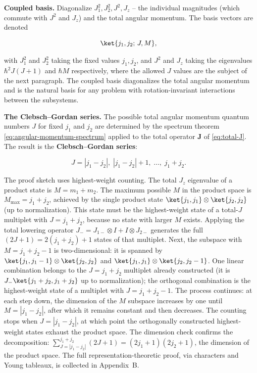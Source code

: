 \textbf{Coupled basis.} Diagonalize $J_1^2, J_2^2, J^2, J_z$ -- the individual magnitudes (which commute with $J^2$ and $J_z$) and the total angular momentum. The basis vectors are denoted
\begin{linenomath}
  \begin{equation}
    \ket{j_1,j_2;\,J,M},
  \end{equation}
\end{linenomath}
with $J_1^2$ and $J_2^2$ taking the fixed values $j_1,j_2$, and $J^2$ and $J_z$ taking the eigenvalues $\hbar^2 J(J+1)$ and $\hbar M$ respectively, where the allowed $J$ values are the subject of the next paragraph. The coupled basis diagonalizes the total angular momentum and is the natural basis for any problem with rotation-invariant interactions between the subsystems.

\medskip\noindent\textbf{The Clebsch--Gordan series.}
The possible total angular momentum quantum numbers $J$ for fixed $j_1$ and $j_2$ are determined by the spectrum theorem \eqref{eq:angular-momentum-spectrum} applied to the total operator $\bm J$ of \eqref{eq:total-J}. The result is the \textbf{Clebsch--Gordan series}:
\begin{linenomath}
  \begin{equation}
    J = |j_1 - j_2|,\; |j_1 - j_2| + 1,\; \ldots,\; j_1 + j_2.
    \label{eq:cg-series}
  \end{equation}
\end{linenomath}
The proof sketch uses highest-weight counting. The total $J_z$ eigenvalue of a product state is $M = m_1 + m_2$. The maximum possible $M$ in the product space is $M_{\max} = j_1 + j_2$, achieved by the single product state $\ket{j_1,j_1}\otimes\ket{j_2,j_2}$ (up to normalization). This state must be the highest-weight state of a total-$J$ multiplet with $J = j_1 + j_2$, because no state with larger $M$ exists. Applying the total lowering operator $J_- = J_{1-} \otimes I + I \otimes J_{2-}$ generates the full $(2J+1) = 2(j_1+j_2)+1$ states of that multiplet. Next, the subspace with $M = j_1 + j_2 - 1$ is two-dimensional: it is spanned by $\ket{j_1,j_1-1}\otimes\ket{j_2,j_2}$ and $\ket{j_1,j_1}\otimes\ket{j_2,j_2-1}$. One linear combination belongs to the $J = j_1+j_2$ multiplet already constructed (it is $J_-\ket{j_1+j_2,j_1+j_2}$ up to normalization); the orthogonal combination is the highest-weight state of a multiplet with $J = j_1+j_2-1$. The process continues: at each step down, the dimension of the $M$ subspace increases by one until $M = |j_1-j_2|$, after which it remains constant and then decreases. The counting stops when $J = |j_1-j_2|$, at which point the orthogonally constructed highest-weight states exhaust the product space. The dimension check confirms the decomposition: $\sum_{J=|j_1-j_2|}^{j_1+j_2} (2J+1) = (2j_1+1)(2j_2+1)$, the dimension of the product space. The full representation-theoretic proof, via characters and Young tableaux, is collected in Appendix~B.

